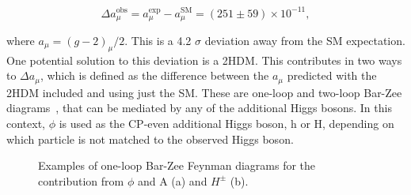 \begin{equation}
\Delta a_{\mu}^{\text{obs}} = a_{\mu}^{\text{exp}} - a_{\mu}^{\text{SM}} = (251 \pm 59) \times 10^{-11},
\end{equation}

where $a_{\mu}=(g-2)_{\mu}/2$. 
This is a 4.2 $\sigma$ deviation away from the \ac{SM} expectation.
One potential solution to this deviation is a \ac{2HDM}.
This contributes in two ways to $\Delta a_{\mu}$, which is defined as the difference between the $a_{\mu}$ predicted with the \ac{2HDM} included and using just the \ac{SM}. 
These are one-loop and two-loop Bar-Zee diagrams~\cite{Ilisie:2015tra,Barr:1990vd}, that can be mediated by any of the additional Higgs bosons.
In this context, $\phi$ is used as the \ac{CP}-even additional Higgs boson, h or H, depending on which particle is not matched to the observed Higgs boson. \\

\begin{figure}[h]
  \centering
  \begin{subfigure}[b]{0.4\textwidth}
  \caption{}
  \end{subfigure}
   \centering
  \begin{subfigure}[b]{0.4\textwidth}
  \caption{}
  \end{subfigure}
  \caption[Feynman diagrams for one-loop contributions to $a_{\mu}$ from 2HDMs.]{Examples of one-loop Bar-Zee Feynman diagrams for the contribution from $\phi$ and A (a) and $H^{\pm}$ (b).}
\end{figure}


